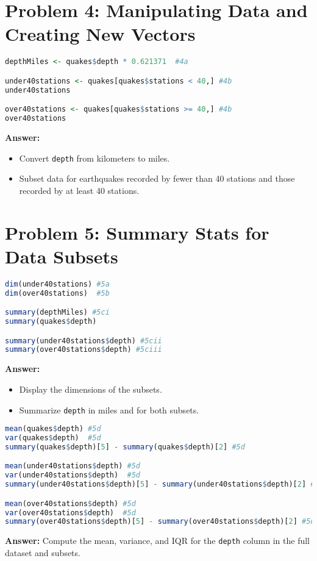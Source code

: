 \documentclass[12pt]{article}
\begin{document}
\section*{Problem 4:  Manipulating Data and Creating New Vectors}
\begin{lstlisting}[language=R]
depthMiles <- quakes$depth * 0.621371  #4a

under40stations <- quakes[quakes$stations < 40,] #4b
under40stations

over40stations <- quakes[quakes$stations >= 40,] #4b
over40stations
\end{lstlisting}
\textbf{Answer:}
\begin{itemize}
    \item Convert \texttt{depth} from kilometers to miles.
    \item Subset data for earthquakes recorded by fewer than 40 stations and those recorded by at least 40 stations.
\end{itemize}

\section*{Problem 5:  Summary Stats for Data Subsets}
\begin{lstlisting}[language=R]
dim(under40stations) #5a
dim(over40stations)  #5b

summary(depthMiles) #5ci
summary(quakes$depth)

summary(under40stations$depth) #5cii
summary(over40stations$depth) #5ciii
\end{lstlisting}
\textbf{Answer:}
\begin{itemize}
    \item Display the dimensions of the subsets.
    \item Summarize \texttt{depth} in miles and for both subsets.
\end{itemize}

\begin{lstlisting}[language=R]
mean(quakes$depth) #5d
var(quakes$depth)  #5d
summary(quakes$depth)[5] - summary(quakes$depth)[2] #5d

mean(under40stations$depth) #5d
var(under40stations$depth)  #5d
summary(under40stations$depth)[5] - summary(under40stations$depth)[2] #5d

mean(over40stations$depth) #5d
var(over40stations$depth)  #5d
summary(over40stations$depth)[5] - summary(over40stations$depth)[2] #5d
\end{lstlisting}
\textbf{Answer:} Compute the mean, variance, and IQR for the \texttt{depth} column in the full dataset and subsets.
\end{document}
